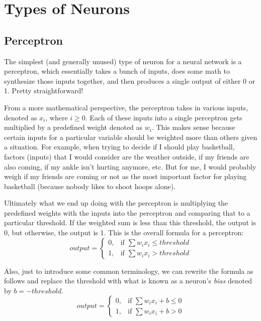 \documentclass[11pt]{article}
\theoremstyle{definition}
\begin{document}
\section{Types of Neurons}
\subsection{Perceptron}
The simplest (and generally unused) type of neuron for a neural network is a perceptron, which essentially takes a bunch of inputs, does some math to synthesize those inputs together, and then produces a single output of either 0 or 1. Pretty straightforward!

From a more mathematical perspective, the perceptron takes in various inputs, denoted as \(x_i\), where \(i \geq 0\). Each of these inputs into a single perceptron gets multiplied by a predefined weight denoted as \(w_i\). This makes sense because certain inputs for a particular variable should be weighted more than others given a situation. For example, when trying to decide if I should play basketball, factors (inputs) that I would consider are the weather outside, if my friends are also coming, if my ankle isn't hurting anymore, etc. But for me, I would probably weigh if my friends are coming or not as the most important factor for playing basketball (because nobody likes to shoot hoops alone).

Ultimately what we end up doing with the perceptron is multiplying the predefined weights with the inputs into the perceptron and comparing that to a particular threshold. If the weighted sum is less than this threshold, the output is 0, but otherwise, the output is 1. This is the overall formula for a perceptron:
$$
output =
\begin{cases}
0, & \text{if   } \sum w_{i}x_i\leq threshold \\
1, & \text{if   } \sum w_{i}x_i > threshold
\end{cases}
$$

Also, just to introduce some common terminology, we can rewrite the formula as follows and replace the threshold with what is known as a neuron's \textit{bias} denoted by \(b = -threshold\).
$$
output =
\begin{cases}
0, & \text{if   } \sum w_{i}x_i + b\leq 0 \\
1, & \text{if   } \sum w_{i}x_i + b > 0
\end{cases}
$$
\end{document}

